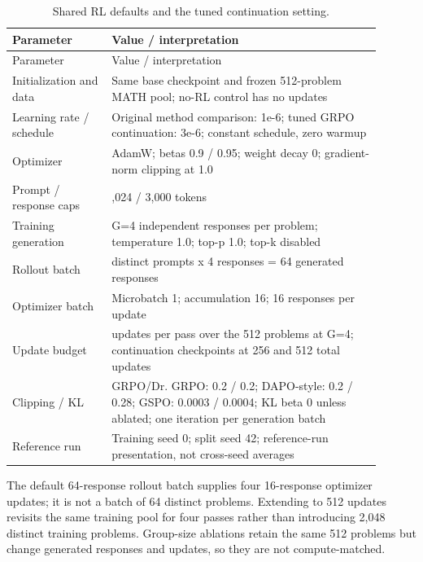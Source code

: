 \documentclass[10pt,letterpaper]{article}
\begin{document}
\begingroup\footnotesize\setlength{\tabcolsep}{3pt}
\begin{longtable}{>{\raggedright\arraybackslash}p{0.2430\linewidth}>{\raggedright\arraybackslash}p{0.6570\linewidth}}
\caption{Shared RL defaults and the tuned continuation setting.}\\
\toprule Parameter & Value /\allowbreak{} interpretation \\
\midrule\endfirsthead
\toprule Parameter & Value /\allowbreak{} interpretation \\
\midrule\endhead
\midrule\multicolumn{2}{r}{Continued on next page}\endfoot
\bottomrule\endlastfoot
Initialization and data & Same base checkpoint and frozen 512-problem MATH pool; no-RL control has no updates \\
Learning rate /\allowbreak{} schedule & Original method comparison: 1e-6; tuned GRPO continuation: 3e-6; constant schedule, zero warmup \\
Optimizer & AdamW; betas 0.9 /\allowbreak{} 0.95; weight decay 0; gradient-norm clipping at 1.0 \\
Prompt /\allowbreak{} response caps & 1,024 /\allowbreak{} 3,000 tokens \\
Training generation & G=4 independent responses per problem; temperature 1.0; top-p 1.0; top-k disabled \\
Rollout batch & 16 distinct prompts x 4 responses = 64 generated responses \\
Optimizer batch & Microbatch 1; accumulation 16; 16 responses per update \\
Update budget & 128 updates per pass over the 512 problems at G=4; continuation checkpoints at 256 and 512 total updates \\
Clipping /\allowbreak{} KL & GRPO/\allowbreak{}Dr. GRPO: 0.2 /\allowbreak{} 0.2; DAPO-style: 0.2 /\allowbreak{} 0.28; GSPO: 0.0003 /\allowbreak{} 0.0004; KL beta 0 unless ablated; one iteration per generation batch \\
Reference run & Training seed 0; split seed 42; reference-run presentation, not cross-seed averages \\
\end{longtable}\endgroup


The default 64-response rollout batch supplies four 16-response optimizer updates; it is not a batch of 64 distinct problems. Extending to 512 updates revisits the same training pool for four passes rather than introducing 2,048 distinct training problems. Group-size ablations retain the same 512 problems but change generated responses and updates, so they are not compute-matched.
\end{document}
